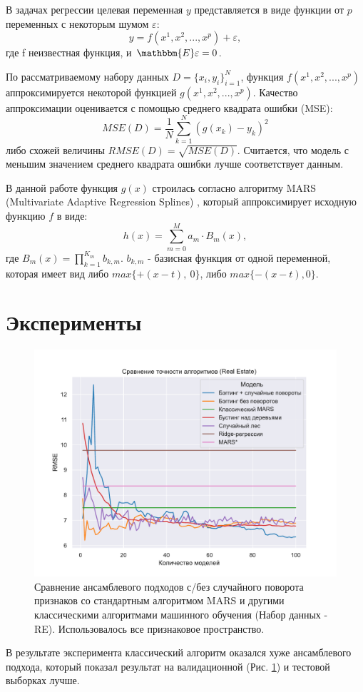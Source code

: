 \documentclass{article}
\begin{document}
В задачах регрессии целевая переменная $y$ представляется в виде функции от $p$ переменных с некоторым шумом $\varepsilon$: $$y=f(x^1, x^2, ..., x^p) + \varepsilon,$$ где f неизвестная функция, и $\mathbbm{E}\varepsilon = 0$.

По рассматриваемому набору данных $D = \{x_i, y_i\}_{i=1}^{N}$, функция $f(x^1, x^2, ..., x^p)$ аппроксимируется некоторой функцией $g(x^1, x^2, ..., x^p)$. Качество аппроксимации оценивается с помощью среднего квадрата ошибки (MSE):
$$MSE(D) = \frac{1}{N}\sum_{k=1}^{N} (g(x_k) - y_k)^2$$
либо схожей величины $RMSE(D) = \sqrt{MSE(D)}$.
Считается, что модель с меньшим значением среднего квадрата ошибки лучше соответствует
данным.

В данной работе функция $g(x)$ строилась согласно алгоритму MARS (Multivariate Adaptive Regression Splines) \cite{friedman1991multivariate}, который аппроксимирует исходную функцию $f$ в виде:
$$h(x) = \sum_{m=0}^{M} a_m \cdot B_m(x),$$ где $B_m(x) = \prod_{k=1}^{K_m} b_{k,m}.$
$b_{k,m}$ - базисная функция от одной переменной, которая имеет вид либо $max\{+(x-t),~0\}$, либо $max\{-(x-t), 0\}.$

\section{Эксперименты}
\begin{figure}[H] %
\begin{center}
    \includegraphics[scale=0.55]{figures/re_valmodels_2.pdf}
    \caption{Сравнение ансамблевого подходов с/без случайного поворота признаков со стандартным алгоритмом MARS и другими классическими алгоритмами машинного обучения (Набор данных - RE). Использовалось все признаковое пространство.}\label{fig::1}
\end{center}
\end{figure}
В результате эксперимента классический алгоритм оказался хуже ансамблевого подхода, который показал результат на валидационной (Рис. \ref{fig::1}) и тестовой выборках лучше.
\end{document}
